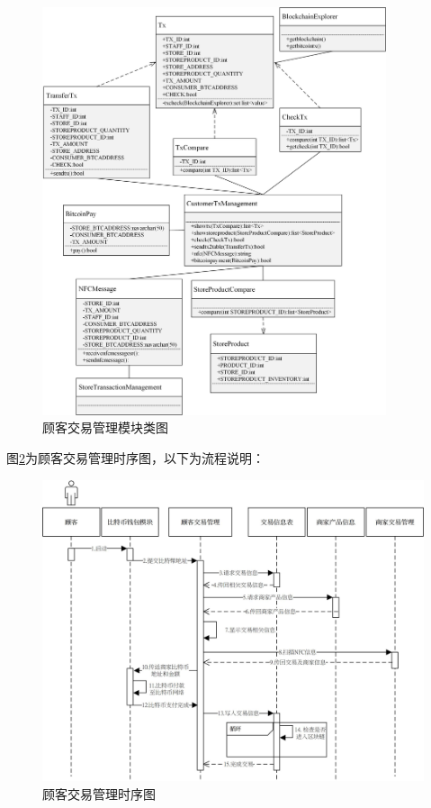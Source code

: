 	\begin{figure}[!htbp]
		\centering
		\includegraphics[width = 0.9\textwidth]{c4.jpg}
		\caption{顾客交易管理模块类图}\label{c4}
	\end{figure}

	

	图\ref{time5}为顾客交易管理时序图，以下为流程说明：

	\begin{figure}[!htbp]
		\centering
		\includegraphics[width = 1\textwidth]{time5.jpg}
		\caption{顾客交易管理时序图}\label{time5}
	\end{figure}

